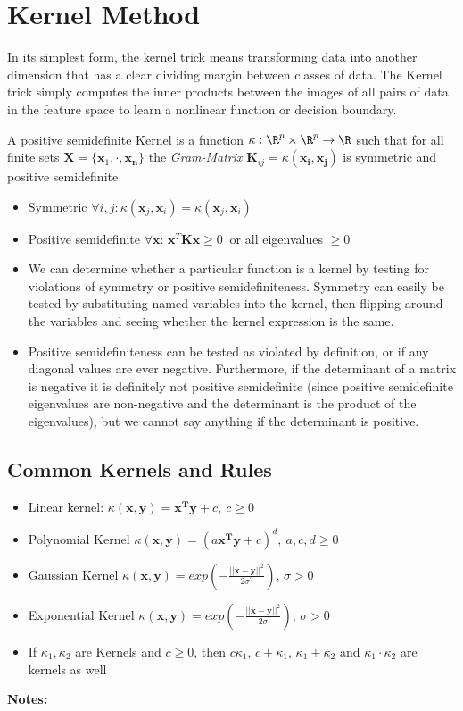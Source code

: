 \documentclass[english]{latex4ei/latex4ei_sheet}
\begin{document}
\section{Kernel Method}
\begin{sectionbox}
In its simplest form, the kernel trick means transforming data into another dimension that has a clear dividing margin between classes of data. The Kernel trick simply computes the inner products between the images of all pairs of data in the feature space to learn a nonlinear function or decision boundary.
\begin{emphbox}
    A positive semidefinite Kernel is a function $\kappa: \R^{p}\times \R^{p}\rightarrow\R$ such that for all finite sets $\mathbf{X}=\{\mathbf{x}_1,\cdot,\mathbf{x_n}\}$ the \emph{Gram-Matrix} $\mathbf{K}_{ij} = \kappa(\mathbf{x_i,x_j})$ is symmetric and positive semidefinite  
\end{emphbox}
\begin{itemize}
    \item Symmetric $\forall i,j: \kappa(\mathbf{x}_j,\mathbf{x}_i)=\kappa(\mathbf{x}_j,\mathbf{x}_i)$
    \item Positive semidefinite $\forall \mathbf{x}$: $\mathbf{x}^T\mathbf{Kx}\ge 0\ $ or all eigenvalues $\ge 0$
    \item We can determine whether a particular function is a kernel by testing for violations of symmetry or positive semidefiniteness.
    Symmetry can easily be tested by substituting named variables into the kernel, then flipping around the variables and seeing whether the kernel expression is the same.
    \item Positive semidefiniteness can be tested as violated by definition, or if any diagonal values are ever negative. Furthermore, if the determinant of a matrix is negative it is definitely not positive semidefinite (since positive semidefinite eigenvalues are non-negative and the determinant is the product of the eigenvalues), but we cannot say anything if the determinant is positive.
\end{itemize}
\subsection{Common Kernels and Rules}
\begin{itemize}
    \item Linear kernel: $\kappa(\mathbf{x,y})=\mathbf{x^Ty}+c, \ c\ge0$
    \item Polynomial Kernel $\kappa(\mathbf{x,y})=(a\mathbf{x^Ty}+c)^d,\ a,c,d\ge0 $
    \item Gaussian Kernel $\kappa(\mathbf{x,y})=exp(-\frac{||\mathbf{x-y}||^2}{2\sigma^2})$, $\sigma>0$
    \item Exponential Kernel $\kappa(\mathbf{x,y})=exp(-\frac{||\mathbf{x-y}||^2}{2\sigma})$, $\sigma>0$
    \item If $\kappa_1, \kappa_2$ are Kernels and $c\ge0$, then $c\kappa_1$, $c+\kappa_1$, $\kappa_1+\kappa_2$ and $\kappa_1\cdot\kappa_2$ are kernels as well
\end{itemize}
\end{sectionbox}
\textbf{Notes:}
\end{document}
